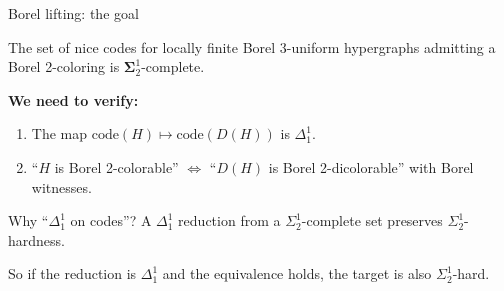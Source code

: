 \documentclass[aspectratio=169, 12pt]{beamer}
\begin{document}

\begin{frame}{Borel lifting: the goal}
\begin{fact}[Thornton]
The set of nice codes for locally finite Borel 3-uniform hypergraphs admitting a Borel 2-coloring is $\mathbf\Sigma^1_2$-complete.
\end{fact}

\pause
\medskip

\textbf{We need to verify:}
\begin{enumerate}
	\item The map $\mathrm{code}(H) \mapsto \mathrm{code}(D(H))$ is $\Delta^1_1$.
	\item ``$H$ is Borel 2-colorable'' $\Longleftrightarrow$ ``$D(H)$ is Borel 2-dicolorable'' with \alert{Borel witnesses}.
\end{enumerate}

\pause
\medskip

\begin{block}{Why ``$\Delta^1_1$ on codes''?}
A $\Delta^1_1$ reduction from a $\Sigma^1_2$-complete set preserves $\Sigma^1_2$-hardness.

So if the reduction is $\Delta^1_1$ and the equivalence holds, the target is also $\Sigma^1_2$-hard.
\end{block}
\end{frame}
\end{document}
